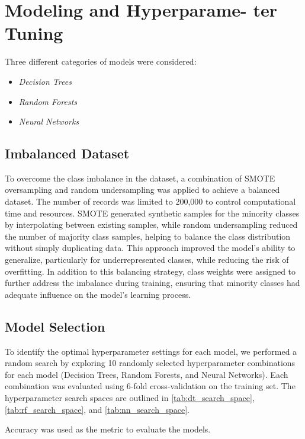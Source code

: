 \section{Modeling and Hyperparame-
ter Tuning}

Three different categories of models were
considered:
\begin{itemize}
    \item \textit{Decision Trees}
    \item \textit{Random Forests}
    \item \textit{Neural Networks}
\end{itemize}


\subsection{Imbalanced Dataset}
To overcome the class imbalance in the dataset, 
a combination of SMOTE oversampling and random 
undersampling was applied to achieve a balanced dataset. 
The number of records was limited to 200,000 to 
control computational time and resources. 
SMOTE generated synthetic samples for the minority 
classes by interpolating between existing samples, 
while random undersampling reduced the number of 
majority class samples, helping to balance the 
class distribution without simply duplicating data. 
This approach improved the model’s ability to 
generalize, particularly for underrepresented 
classes, while reducing the risk of overfitting. 
In addition to this balancing strategy, class 
weights were assigned to further address the 
imbalance during training, ensuring that minority 
classes had adequate influence on the model’s 
learning process.

\subsection{Model Selection}
To identify the optimal hyperparameter settings for 
each model, we performed a random search by exploring 
10 randomly selected hyperparameter combinations for 
each model (Decision Trees, Random Forests, and 
Neural Networks). Each combination was evaluated 
using 6-fold cross-validation on the training set. 
The hyperparameter search spaces 
are outlined in \autoref{tab:dt_search_space}, 
\autoref{tab:rf_search_space}, and 
\autoref{tab:nn_search_space}.

Accuracy was used as the metric to evaluate
the models.


